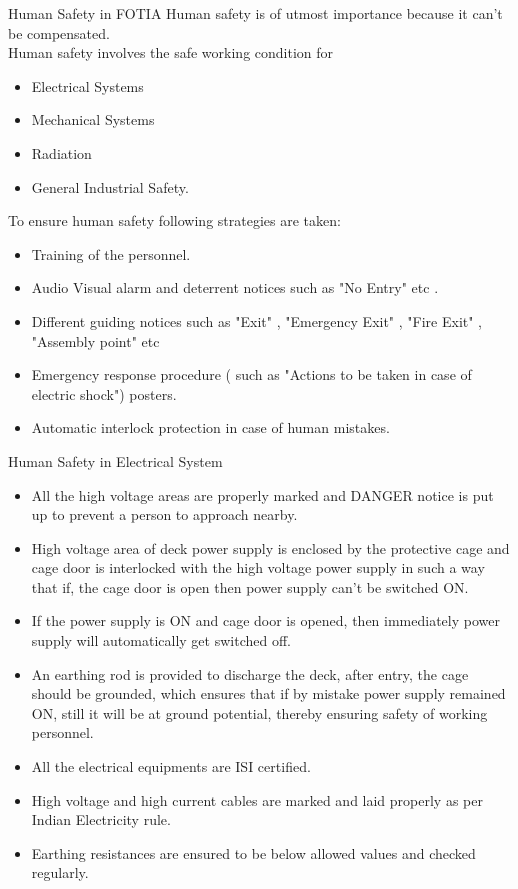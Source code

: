 \documentclass[11pt]{beamer}
\begin{document}
\begin{frame}{Human Safety in FOTIA}
Human safety is of utmost importance because it can’t be compensated.\\
	
Human safety involves the safe working condition for 
 \begin{itemize} 
 \item Electrical Systems
 \item Mechanical Systems
 \item Radiation 
 \item General Industrial Safety.
\end{itemize}		
To ensure human safety following strategies are taken: 
\begin{itemize}
\item Training of the personnel.
\item Audio Visual alarm and deterrent notices such as "No Entry" etc .
\item Different guiding notices such as "Exit" , "Emergency Exit" , "Fire Exit" , "Assembly point" etc
\item Emergency response procedure ( such as "Actions to be taken in case of electric shock") posters.  
\item Automatic interlock protection in case of human mistakes. 
\end{itemize}	 
 
\end{frame}

\begin{frame}{Human Safety in Electrical System}

 \begin{itemize} 
 \item All the high voltage areas are properly marked and DANGER notice is put up to prevent a person to approach nearby.
\item High voltage area of  deck power supply is enclosed by the protective cage and cage door is interlocked with the high voltage power supply in such a way that if, the cage door is open then power supply can’t be switched ON.
\item If the power supply is ON and cage door is opened, then immediately power supply will automatically get switched off.
\item An earthing rod is provided to discharge the deck, after entry, the cage should be grounded, which ensures that if by mistake power supply remained ON, still it will be at ground potential, thereby ensuring safety of working personnel. 
\item All the electrical equipments are ISI certified.
 \item High voltage and high current cables are marked and laid properly as per Indian Electricity rule.
\item Earthing resistances are ensured to be below allowed values and checked regularly. 
\end{itemize}		
	 
 
\end{frame}
\end{document}
